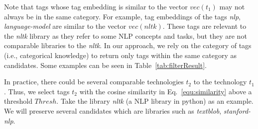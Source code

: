 Note that tags whose tag embedding is similar to the vector $vec(t_1)$ may not always be in the same category.
For example, tag embeddings of the tags \textit{nlp}, \textit{language-model} are similar to the vector $vec(nltk)$.
These tags are relevant to the \textit{nltk} library as they refer to some NLP concepts and tasks, but they are not comparable libraries to the \textit{nltk}.
In our approach, we rely on the category of tags (i.e., categorical knowledge) to return only tags within the same category as candidates.
Some examples can be seen in Table~\ref{tab:filterResult}.


In practice, there could be several comparable technologies $t_2$ to the technology $t_1$.
Thus, we select tags $t_2$ with the cosine similarity in Eq.~\ref{equ:similarity} above a threshold $Thresh$.
Take the library \textit{nltk} (a NLP library in python) as an example.
We will preserve several candidates which are libraries such as \textit{textblob}, \textit{stanford-nlp}.